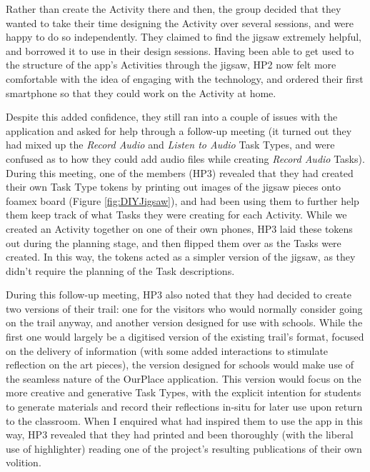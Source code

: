 Rather than create the Activity there and then, the group decided that they wanted to take their time designing the Activity over several sessions, and were happy to do so independently. They claimed to find the jigsaw extremely helpful, and borrowed it to use in their design sessions. Having been able to get used to the structure of the app's Activities through the jigsaw, HP2 now felt more comfortable with the idea of engaging with the technology, and ordered their first smartphone so that they could work on the Activity at home.

Despite this added confidence, they still ran into a couple of issues with the application and asked for help through a follow-up meeting (it turned out they had mixed up the \textit{Record Audio} and \textit{Listen to Audio} Task Types, and were confused as to how they could add audio files while creating \textit{Record Audio} Tasks). During this meeting, one of the members (HP3) revealed that they had created their own Task Type tokens by printing out images of the jigsaw pieces onto foamex board (Figure \ref{fig:DIYJigsaw}), and had been using them to further help them keep track of what Tasks they were creating for each Activity. While we created an Activity together on one of their own phones, HP3 laid these tokens out during the planning stage, and then flipped them over as the Tasks were created. In this way, the tokens acted as a simpler version of the jigsaw, as they didn't require the planning of the Task descriptions.

During this follow-up meeting, HP3 also noted that they had decided to create two versions of their trail: one for the visitors who would normally consider going on the trail anyway, and another version designed for use with schools. While the first one would largely be a digitised version of the existing trail's format, focused on the delivery of information (with some added interactions to stimulate reflection on the art pieces), the version designed for schools would make use of the seamless nature of the OurPlace application. This version would focus on the more creative and generative Task Types, with the explicit intention for students to generate materials and record their reflections in-situ for later use upon return to the classroom. When I enquired what had inspired them to use the app in this way, HP3 revealed that they had printed and been thoroughly (with the liberal use of highlighter) reading one of the project's resulting publications \citep{Richardson2018} of their own volition.


